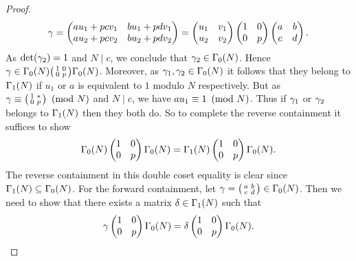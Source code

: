 \begin{proof}
      \[
        \gamma = \begin{pmatrix} au_{1}+pcv_{1} & bu_{1}+pdv_{1} \\ au_{2}+pcv_{2} & bu_{2}+pdv_{2} \end{pmatrix} = \begin{pmatrix} u_{1} & v_{1} \\ u_{2} & v_{2}\end{pmatrix}\begin{pmatrix} 1 & 0 \\ 0 & p\end{pmatrix}\begin{pmatrix} a & b \\ c & d\end{pmatrix}.
      \]
      As $\det(\gamma_{2}) = 1$ and $N \mid c$, we conclude that $\gamma_{2} \in \Gamma_{0}(N)$. Hence $\gamma \in \Gamma_{0}(N)\begin{psmallmatrix} 1 & 0 \\ 0 & p \end{psmallmatrix}\Gamma_{0}(N)$. Moreover, as $\gamma_{1},\gamma_{2} \in \Gamma_{0}(N)$ it follows that they belong to $\Gamma_{1}(N)$ if $u_{1}$ or $a$ is equivalent to $1$ modulo $N$ respectively. But as $\gamma \equiv \begin{psmallmatrix} 1 & \ast \\ 0 & p \end{psmallmatrix} \ \left(\text{mod }N\right)$ and $N \mid c$, we have $au_{1} \equiv 1 \ \left(\text{mod }N\right)$. Thus if $\gamma_{1}$ or $\gamma_{2}$ belongs to $\Gamma_{1}(N)$ then they both do. So to complete the reverse containment it suffices to show
      \[
        \Gamma_{0}(N)\begin{pmatrix} 1 & 0 \\ 0 & p \end{pmatrix}\Gamma_{0}(N) = \Gamma_{1}(N)\begin{pmatrix} 1 & 0 \\ 0 & p \end{pmatrix}\Gamma_{0}(N).
      \]
      The reverse containment in this double coset equality is clear since $\Gamma_{1}(N) \subseteq \Gamma_{0}(N)$. For the forward containment, let $\gamma = \begin{psmallmatrix} a & b \\ c & d \end{psmallmatrix} \in \Gamma_{0}(N)$. Then we need to show that there exists a matrix $\delta \in \Gamma_{1}(N)$ such that
      \[
        \gamma\begin{pmatrix} 1 & 0 \\ 0 & p \end{pmatrix}\Gamma_{0}(N) = \delta\begin{pmatrix} 1 & 0 \\ 0 & p \end{pmatrix}\Gamma_{0}(N).
\]
\end{proof}

